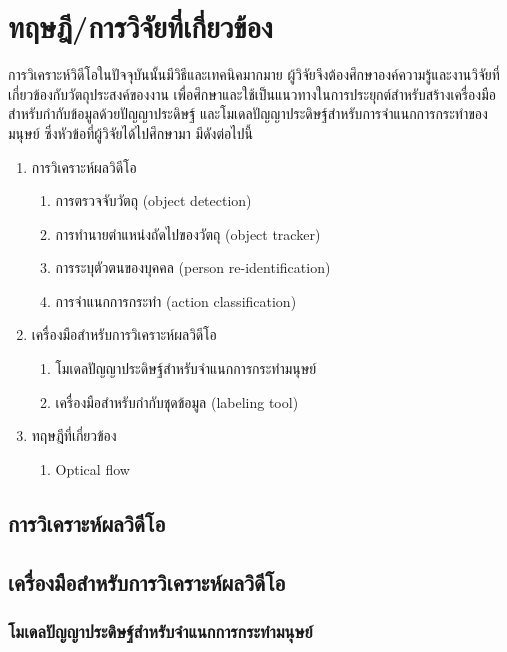 \clearpage
\chapter{ทฤษฎี/การวิจัยที่เกี่ยวข้อง}
การวิเคราะห์วิดีโอในปัจจุบันนั้นมีวิธีและเทคนิคมากมาย ผู้วิจัยจึงต้องศึกษาองค์ความรู้และงานวิจัยที่เกี่ยวข้องกับวัตถุประสงค์ของงาน 
เพื่อศึกษาและใช้เป็นแนวทางในการประยุกต์สำหรับสร้างเครื่องมือสำหรับกำกับข้อมูลด้วยปัญญาประดิษฐ์ และโมเดลปัญญาประดิษฐ์สำหรับการจำแนกการกระทำของมนุษย์ 
ซึ่งหัวข้อที่ผู้วิจัยได้ไปศึกษามา มีดังต่อไปนี้
\begin{enumerate}
	\setlength\itemsep{-0.25em}
	\item การวิเคราะห์ผลวิดีโอ
	\begin{enumerate}	
		\item การตรวจจับวัตถุ (object detection)
		\item การทำนายตำแหน่งถัดไปของวัตถุ (object tracker)
		\item การระบุตัวตนของบุคคล (person re-identification)
		\item การจำแนกการกระทำ (action classification)
	\end{enumerate}
	\setlength\itemsep{-0.25em}
	\item เครื่องมือสำหรับการวิเคราะห์ผลวิดีโอ
	\begin{enumerate}	
		\item โมเดลปัญญาประดิษฐ์สำหรับจำแนกการกระทำมนุษย์
		\item เครื่องมือสำหรับกำกับชุดข้อมูล (labeling tool)
	\end{enumerate}
	\item ทฤษฎีที่เกี่ยวข้อง
	\begin{enumerate}	
		\item Optical flow
	\end{enumerate}
\end{enumerate}

\section{การวิเคราะห์ผลวิดีโอ}


\section{เครื่องมือสำหรับการวิเคราะห์ผลวิดีโอ}
\subsection{โมเดลปัญญาประดิษฐ์สำหรับจำแนกการกระทำมนุษย์}
